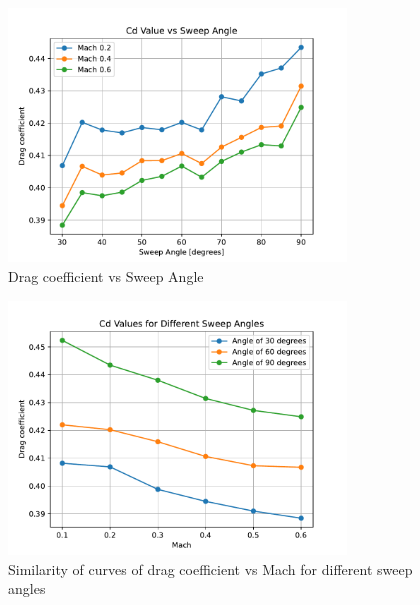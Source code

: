 \documentclass{article}
\begin{document}
\begin{figure}[H]
    \centering
    \includegraphics[width=0.8\textwidth]{../data/R6-Parametric-Fins/CDvsSweep.pdf}
    \caption{Drag coefficient vs Sweep Angle}
    \label{fig:CdVsSweep}
\end{figure}

\begin{figure}[H]
    \centering
    \includegraphics[width=0.8\textwidth]{../data/R6-Parametric-Fins/CDvsMach.pdf}
    \caption{Similarity of curves of drag coefficient vs Mach for different sweep angles}
\end{figure}
\end{document}
